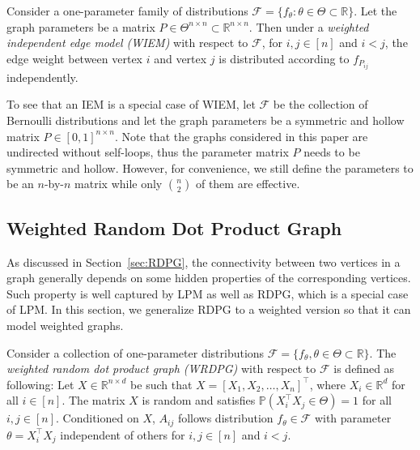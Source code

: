 \begin{definition} 
\label{def:WIEM}
Consider a one-parameter family of distributions $\mathcal{F} = \{ f_{\theta} : \theta \in \Theta \subset \mathbb{R} \}$. Let the graph parameters be a matrix $P \in \Theta^{n \times n} \subset \mathbb{R}^{n \times n}$.
Then under a {\em{weighted independent edge model} (WIEM)} with respect to $\mathcal{F}$, for $i, j \in [n]$ and $i < j$, the edge weight between vertex $i$ and vertex $j$ is distributed according to $f_{P_{ij}}$ independently.
\end{definition}

To see that an IEM is a special case of WIEM, let $\mathcal{F}$ be the collection of Bernoulli distributions and let the graph parameters be a symmetric and hollow matrix $P \in [0, 1]^{n \times n}$.
Note that the graphs considered in this paper are undirected without self-loops, thus the parameter matrix $P$ needs to be symmetric and hollow. However, for convenience, we still define the parameters to be an $n$-by-$n$ matrix while only $n \choose 2$ of them are effective.



\subsection{Weighted Random Dot Product Graph}
\label{sec:WRDPG}

As discussed in Section~\ref{sec:RDPG}, the connectivity between two vertices in a graph generally depends on some hidden properties of the corresponding vertices. Such property is well captured by LPM as well as RDPG, which is a special case of LPM. In this section, we generalize RDPG to a weighted version so that it can model weighted graphs. 

\begin{definition}
Consider a collection of one-parameter distributions $\mathcal{F} = \{ f_{\theta}, \theta \in \Theta \subset \mathbb{R} \}$. The {\em{weighted random dot product graph (WRDPG)}} with respect to $\mathcal{F}$ is defined as following: Let $X \in \mathbb{R}^{n \times d}$ be such that $X = [X_1, X_2, \dotsc, X_n]^{\top}$, where $X_i \in \mathbb{R}^d$ for all $i \in [n]$. The matrix $X$ is random and satisfies $\mathbb{P}( X_i^{\top} X_j \in \Theta ) = 1$ for all $i, j \in [n]$. Conditioned on $X$, $A_{ij}$ follows distribution $f_{\theta} \in \mathcal{F}$ with parameter $\theta = X_i^{\top} X_j$ independent of others for $i, j \in [n]$ and $i < j$.
\end{definition}

